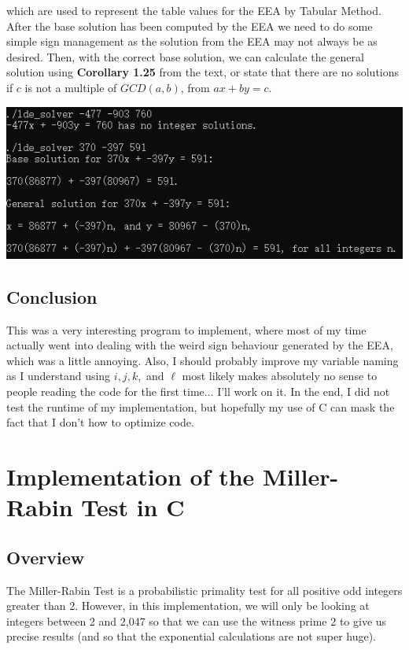 \documentclass{article}
\begin{document}
\noindent which are used to represent the table values for the EEA by Tabular Method.
After the base solution has been
computed by the EEA we need to do some simple sign management as the solution from the EEA may
not always be as desired. Then, with the correct base solution, we can calculate the general solution using
\textbf{Corollary 1.25} from the text, or state that there are no solutions if $c$ is not a multiple of $GCD(a,b)$,
from $ax + by = c$.
\begin{center}
  \includegraphics[scale=0.9]{example.PNG}
\end{center}
\subsection{Conclusion}
This was a very interesting program to implement, where most of my time actually went into dealing with
the weird sign
behaviour generated by the EEA, which was a little annoying.
Also, I should probably improve my variable naming as I understand using $i,j,k,$ and $\ell$
most likely makes absolutely no sense to people reading the code for the first time... I'll work on it. 
In the end, I did not test the runtime of my implementation,
but hopefully my use of C can mask the fact that I don't how to optimize code.
\newpage

\section{Implementation of the Miller-Rabin Test in C}
\subsection{Overview}
The Miller-Rabin Test is a probabilistic primality test for all positive odd integers greater than 2.
However, in this implementation, we will only be looking at integers between 2 and 2,047 so that we can use the
witness prime 2 to give us precise results (and so that the exponential calculations are not super huge).
\end{document}
